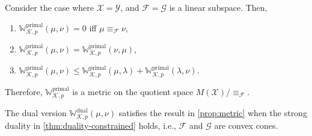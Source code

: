 \documentclass[10pt]{article}
\newcommand{\op}[1]{\operatorname{#1}}
\newcommand{\prim}{\op{primal}}
\newcommand{\dual}{\op{dual}}
\newcommand{\W}{\mathds{W}}
\newcommand{\calF}{\mathcal{F}}
\newcommand{\calG}{\mathcal{G}}
\newcommand{\calK}{\mathcal{K}}
\newcommand{\calX}{\mathcal{X}}
\newcommand{\calY}{\mathcal{Y}}
\numberwithin{equation}{section}
\begin{document}
\begin{corollary}
Consider the case where $\calX=\calY$, and $\calF =\calG$ is a linear subspace. Then,
	\begin{enumerate}
	\item $\W_{\calK,p}^{\prim}(\mu,\nu) = 0$ iff $\mu \equiv_\calF \nu $,
	\item $\W_{\calK,p}^{\prim}(\mu,\nu)=\W_{\calK,p}^{\prim}(\nu,\mu)$,
	\item $\W_{\calK,p}^{\prim}(\mu,\nu) \leq \W_{\calK,p}^{\prim}(\mu,\lambda) + \W_{\calK,p}^{\prim}(\lambda,\nu)$.
\end{enumerate}
Therefore, $\W_{\calK,p}^{\prim}$ is a metric on the quotient space $M(\calX)/\equiv_\calF$.
\end{corollary}

\begin{proposition}The dual version $\W_{\calK,p}^{\dual}(\mu,\nu) $ satisfies the result in \autoref{prop:metric} when the strong duality in \autoref{thm:duality-constrained} holds, i.e., $\calF$ and $\calG$ are convex cones. 
\end{proposition}
\end{document}
